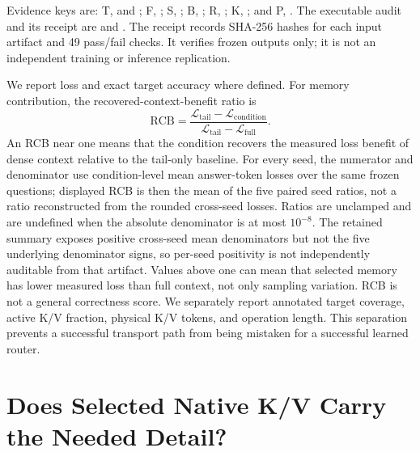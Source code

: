 \documentclass[11pt]{article}
\begin{document}
Evidence keys are: T,  and
; F,
; S,
; B,
; R,
; K,
; and P,
.
The executable audit and its receipt are
 and
. The receipt records SHA-256 hashes for
each input artifact and 49 pass/fail checks. It verifies frozen outputs only; it is not an
independent training or inference replication.

We report loss and exact target accuracy where defined. For memory contribution, the
recovered-context-benefit ratio is
\begin{equation}
 \mathrm{RCB}=\frac{\mathcal{L}_{\mathrm{tail}}-\mathcal{L}_{\mathrm{condition}}}
 {\mathcal{L}_{\mathrm{tail}}-\mathcal{L}_{\mathrm{full}}}.
 \label{eq:rcb}
\end{equation}
An RCB near one means that the condition recovers the measured loss benefit of dense
context relative to the tail-only baseline. For every seed, the numerator and denominator
use condition-level mean answer-token losses over the same frozen questions; displayed RCB
is then the mean of the five paired seed ratios, not a ratio reconstructed from the rounded
cross-seed losses. Ratios are unclamped and are undefined when the absolute denominator is at
most $10^{-8}$. The retained summary exposes positive cross-seed mean denominators but not the
five underlying denominator signs, so per-seed positivity is not independently auditable from
that artifact. Values above one can mean that
selected memory has lower measured loss than full context, not only sampling variation. RCB
is not a general correctness score. We separately report annotated target
coverage, active K/V fraction, physical K/V tokens, and operation length. This separation
prevents a successful transport path from being mistaken for a successful learned router.

\section{Does Selected Native K/V Carry the Needed Detail?}
\label{sec:transport}
\end{document}
